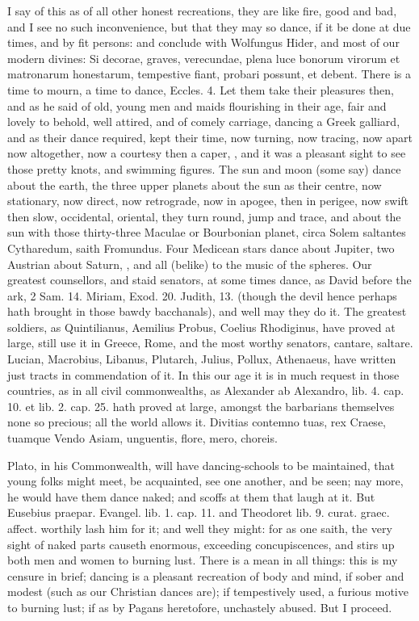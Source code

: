 I say of this as of all other honest recreations, they are like fire,
good and bad, and I see no such inconvenience, but that they may so
dance, if it be done at due times, and by fit persons: and conclude
with Wolfungus Hider, and most of our modern divines: Si decorae,
graves, verecundae, plena luce bonorum virorum et matronarum
honestarum, tempestive fiant, probari possunt, et debent. There is a
time to mourn, a time to dance, Eccles.  4. Let them take their
pleasures then, and as  he said of old, young men and maids
flourishing in their age, fair and lovely to behold, well attired, and
of comely carriage, dancing a Greek galliard, and as their dance
required, kept their time, now turning, now tracing, now apart now
altogether, now a courtesy then a caper, \etc{}, and it was a pleasant
sight to see those pretty knots, and swimming figures. The sun and moon
(some say) dance about the earth, the three upper planets about the sun
as their centre, now stationary, now direct, now retrograde, now in
apogee, then in perigee, now swift then slow, occidental, oriental,
they turn round, jump and trace, \Venus{} and \Mercury{} about the sun with those
thirty-three Maculae or Bourbonian planet, circa Solem saltantes
Cytharedum, saith Fromundus. Four Medicean stars dance about Jupiter,
two Austrian about Saturn, \etc{}, and all (belike) to the music of the
spheres. Our greatest counsellors, and staid senators, at some times
dance, as David before the ark, 2 Sam.  14. Miriam, Exod.  20.
Judith,  13. (though the devil hence perhaps hath brought in those
bawdy bacchanals), and well may they do it. The greatest soldiers, as
 Quintilianus, Aemilius Probus, Coelius Rhodiginus,
have proved at large, still use it in Greece, Rome, and the most worthy
senators, cantare, saltare. Lucian, Macrobius, Libanus, Plutarch,
Julius, Pollux, Athenaeus, have written just tracts in commendation of
it. In this our age it is in much request in those countries, as in all
civil commonwealths, as Alexander ab Alexandro, lib. 4. cap. 10. et
lib. 2. cap. 25. hath proved at large, amongst the barbarians
themselves none so precious; all the world allows it.
Divitias contemno tuas, rex Craese, tuamque
Vendo Asiam, unguentis, flore, mero, choreis.

Plato, in his Commonwealth, will have dancing-schools to be
maintained, that young folks might meet, be acquainted, see one
another, and be seen; nay more, he would have them dance naked; and
scoffs at them that laugh at it. But Eusebius praepar. Evangel. lib. 1.
cap. 11. and Theodoret lib. 9. curat. graec. affect. worthily lash him
for it; and well they might: for as one saith, the very sight of
naked parts causeth enormous, exceeding concupiscences, and stirs up
both men and women to burning lust. There is a mean in all things: this
is my censure in brief; dancing is a pleasant recreation of body and
mind, if sober and modest (such as our Christian dances are); if
tempestively used, a furious motive to burning lust; if as by Pagans
heretofore, unchastely abused. But I proceed.

